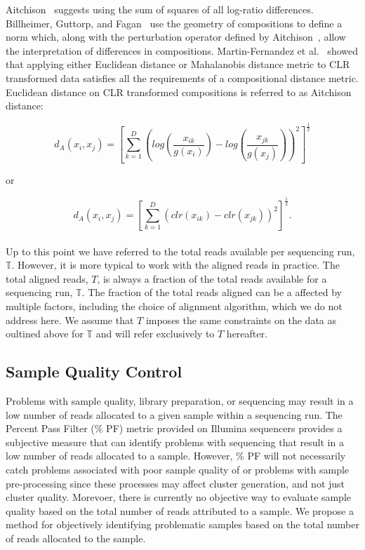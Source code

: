 \documentclass{article}\usepackage[]{graphicx}\usepackage[]{color}
\theoremstyle{definition}
\begin{document}
Aitchison~\cite{Aitchison1986, Aitchison1992} suggests using the sum of squares of all log-ratio differences.  Billheimer, Guttorp, and Fagan~\cite{Billheimer2001} use the geometry of compositions to define a norm which, along with the perturbation operator defined by Aitchison~\cite{Aitchison1986}, allow the interpretation of differences in compositions. Martin-Fernandez et al.~\cite{Martin-Fernandez1998} showed that applying either Euclidean distance or Mahalanobis distance metric to CLR transformed data satisfies all the requirements of a compositional distance metric. Euclidean distance on CLR transformed compositions is referred to as Aitchison distance:

$$d_A(x_i, x_j) = \left[\sum_{k=1}^D \left( log \left(\frac{x_{ik}}{g(x_i)} \right) - log \left(\frac{x_{jk}}{g(x_j)} \right) \right)^2  \right]^\frac{1}{2}$$

or 

$$d_A(x_i, x_j) = \left[\sum_{k=1}^D \left( clr(x_{ik}) - clr(x_{jk}) \right)^2  \right]^\frac{1}{2}.$$
\\

Up to this point we have referred to the total reads available per sequencing run, $\mathbb{T}$.  However, it is more typical to work with the aligned reads in practice.  The total aligned reads, $T$, is always a fraction of the total reads available for a sequencing run, $\mathbb{T}$.  The fraction of the total reads aligned can be a affected by multiple factors, including the choice of alignment algorithm, which we do not address here.  We assume that $T$ imposes the same constraints on the data as oultined above for $\mathbb{T}$ and will refer exclusively to $T$ hereafter.\\  



\subsection{Sample Quality Control}
Problems with sample quality, library preparation, or sequencing may result in a low number of reads allocated to a given sample within a sequencing run.  The Percent Pass Filter (\% PF) metric provided on Illumina sequencers provides a subjective measure that can identify problems with sequencing that result in a low number of reads allocated to a sample.  However, \% PF will not necessarily catch problems associated with poor sample quality of or problems with sample pre-processing since these processes may affect cluster generation, and not just cluster quality.  Morevoer, there is currently no objective way to evaluate sample quality based on the total number of reads attributed to a sample. We propose a method for objectively identifying problematic samples based on the total number of reads allocated to the sample. \\
\end{document}
